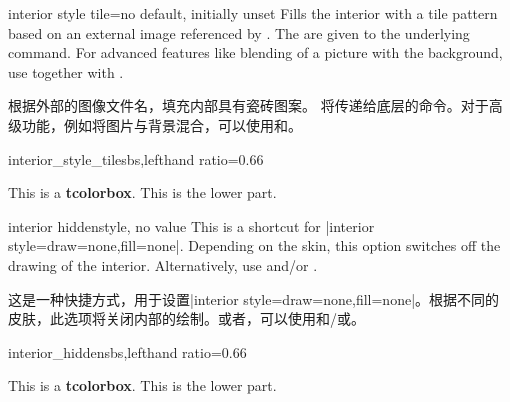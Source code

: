 \begin{docTcbKey}{interior style tile}{=}{no default, initially unset}
Fills the interior with a tile pattern based on an external image referenced by .
The  are given to the underlying  command.
For advanced features like blending of a picture with the background,
use  together with .

根据外部的图像文件名，填充内部具有瓷砖图案。 将传递给底层的命令。对于高级功能，例如将图片与背景混合，可以使用和。
\begin{exdispExample*}{interior_style_tile}{sbs,lefthand ratio=0.66}

\begin{tcolorbox}[enhanced,title=My title,
interior style tile={width=2cm}{crinklepaper.png}]
This is a \textbf{tcolorbox}.
\tcblower
This is the lower part.
\end{tcolorbox}
\end{exdispExample*}
\end{docTcbKey}

\begin{docTcbKey}{interior hidden}{}{style, no value}
This is a shortcut for |interior style={draw=none,fill=none}|.
Depending on the skin, this option switches off the drawing of the
interior.
Alternatively, use  and/or .

这是一种快捷方式，用于设置|interior style={draw=none,fill=none}|。根据不同的皮肤，此选项将关闭内部的绘制。或者，可以使用和/或。
\begin{exdispExample*}{interior_hidden}{sbs,lefthand ratio=0.66}

\begin{tcolorbox}[enhanced,title=My title,
interior hidden]
This is a \textbf{tcolorbox}.
\tcblower
This is the lower part.
\end{tcolorbox}
\end{exdispExample*}
\end{docTcbKey}

